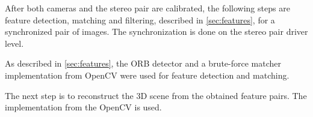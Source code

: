 After both cameras and the stereo pair are calibrated, the following steps are feature detection, matching and filtering, described in \autoref{sec:features}, for a synchronized pair of images. 
The synchronization is done on the stereo pair driver level.

As described in \autoref{sec:features}, the ORB detector and a brute-force matcher implementation from OpenCV were used for feature detection and matching.

The next step is to reconstruct the 3D scene from the obtained feature pairs.
The implementation from the OpenCV is used.

